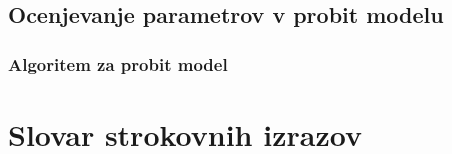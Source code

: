 \documentclass[12pt,a4paper]{amsart}
\theoremstyle{definition} %
\theoremstyle{plain} %
\newcommand{\geslo}[2]{\noindent\textbf{#1}\hspace*{3mm}\hangindent=\parindent\hangafter=1 #2}
\begin{document}
\subsection{Ocenjevanje parametrov v probit modelu}

\subsubsection{Algoritem za probit model}



\section*{Slovar strokovnih izrazov}
%
%
\nocite{*}


\end{document}
